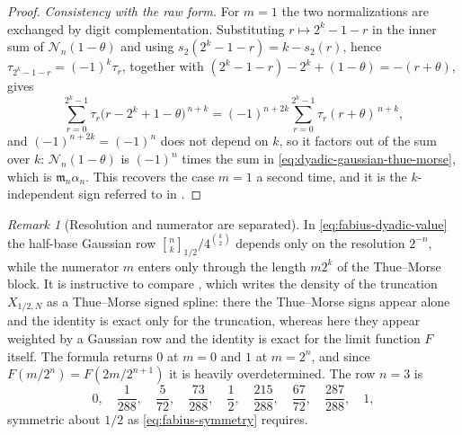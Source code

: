 \documentclass[11pt,oneside,openany]{book}
\theoremstyle{definition}
\theoremstyle{remark}
\newtheorem{remark}[remark]{Remark}
\newcommand{\Qbinom}[3]{\genfrac{[}{]}{0pt}{}{#1}{#2}_{#3}}
\newcommand{\set}[1]{\left\{#1\right\}}
\begin{document}
\begin{proof}
\emph{Consistency with the raw form.}  For $m=1$ the two normalizations are exchanged
by digit complementation.  Substituting $r\mapsto2^k-1-r$ in the inner sum of
$\mathcal N_n(1-\theta)$ and using $s_2(2^k-1-r)=k-s_2(r)$, hence
$\tau_{2^k-1-r}=(-1)^k\tau_r$, together with
$(2^k-1-r)-2^k+(1-\theta)=-(r+\theta)$, gives
\[
 \sum_{r=0}^{2^k-1}\tau_r\bigl(r-2^k+1-\theta\bigr)^{\,n+k}
 =(-1)^{n+2k}\sum_{r=0}^{2^k-1}\tau_r(r+\theta)^{\,n+k},
\]
and $(-1)^{n+2k}=(-1)^n$ does not depend on $k$, so it factors out of the sum over
$k$: $\mathcal N_n(1-\theta)$ is $(-1)^n$ times the sum in
\eqref{eq:dyadic-gaussian-thue-morse}, which is $\mathfrak m_n\alpha_n$.  This
recovers the case $m=1$ a second time, and it is the $k$-independent sign referred to
in .
\end{proof}

\begin{remark}[Resolution and numerator are separated]\label{rem:fabius-dyadic-architecture}
In \eqref{eq:fabius-dyadic-value} the half-base Gaussian row
$\Qbinom nk{1/2}\big/4^{\binom k2}$ depends only on the resolution $2^{-n}$, while the
numerator $m$ enters only through the length $m2^k$ of the Thue--Morse block.  It is
instructive to compare , which writes the density of
the truncation $X_{1/2,N}$ as a Thue--Morse signed spline: there the Thue--Morse signs
appear alone and the identity is exact only for the truncation, whereas here they
appear weighted by a Gaussian row and the identity is exact for the limit function $F$
itself.  The formula returns $0$ at $m=0$ and $1$ at $m=2^n$, and since
$F(m/2^n)=F(2m/2^{n+1})$ it is heavily overdetermined.  The row $n=3$ is
\[
 0,\quad\frac1{288},\quad\frac5{72},\quad\frac{73}{288},\quad\frac12,
 \quad\frac{215}{288},\quad\frac{67}{72},\quad\frac{287}{288},\quad1,
\]
symmetric about $1/2$ as \eqref{eq:fabius-symmetry} requires.
\end{remark}
\end{document}
